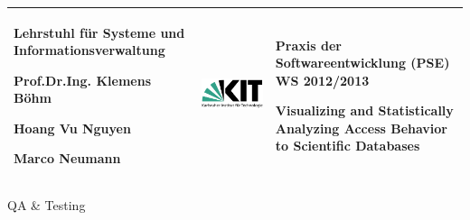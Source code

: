 \begin{titlepage}

\vspace*{-3cm}
\begin{center}

\begin{tabular}{m{5.5cm} m{5cm} m{5.5cm}}
\arrayrulecolor{Bittersweet!90}

\begin{center}
\footnotesize{
\textbf{ Lehrstuhl für Systeme und Informationsverwaltung}
\newline

Prof.Dr.Ing. Klemens Böhm

Hoang Vu Nguyen

Marco Neumann
} 	
\end{center}
   & 
\begin{center}

   \includegraphics[width=0.9\linewidth]{Pictures/KIT-Logo.png}
   
\end{center}    
   & 
\begin{center}
\footnotesize{
\textbf{Praxis der Softwareentwicklung (PSE)}\newline
WS 2012/2013\newline

Visualizing and Statistically Analyzing Access Behavior to Scientific Databases
}
\end{center}\\
\hline
 
\end{tabular}


\vspace*{4.6cm}

\Huge
QA \& Testing

\vspace*{1.5cm}

\normalsize

\begin{center}


\end{center}
\end{center}
\end{titlepage}
